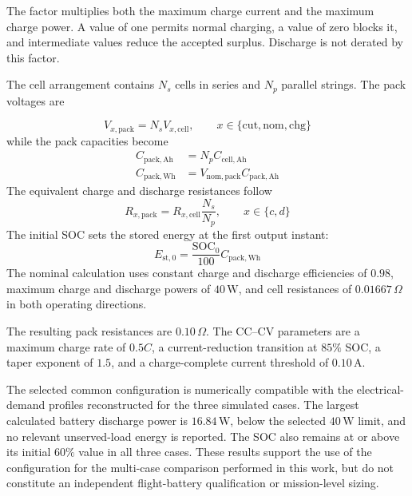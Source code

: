 The factor multiplies both the maximum charge current and the maximum charge
power. A value of one permits normal charging, a value of zero blocks it, and
intermediate values reduce the accepted surplus. Discharge is not derated by
this factor.

The cell arrangement contains $N_s$ cells in series and $N_p$ parallel
strings. The pack voltages are

\begin{equation}
    V_{x,\mathrm{pack}}
    =
    N_s V_{x,\mathrm{cell}},
    \qquad
    x\in\{\mathrm{cut},\mathrm{nom},\mathrm{chg}\}
    \label{eq:battery_pack_voltages_ch8}
\end{equation}
while the pack capacities become
\begin{align}
    C_{\mathrm{pack,Ah}}
    &=
    N_p C_{\mathrm{cell,Ah}}
    \label{eq:battery_pack_capacity_ah_ch8}
    \\
    C_{\mathrm{pack,Wh}}
    &=
    V_{\mathrm{nom,pack}}C_{\mathrm{pack,Ah}}
    \label{eq:battery_pack_capacity_wh_ch8}
\end{align}
The equivalent charge and discharge resistances follow
\begin{equation}
    R_{x,\mathrm{pack}}
    =
    R_{x,\mathrm{cell}}\frac{N_s}{N_p},
    \qquad
    x\in\{c,d\}
    \label{eq:battery_pack_resistance_ch8}
\end{equation}
The initial SOC sets the stored energy at the first output instant:
\begin{equation}
    E_{\mathrm{st},0}
    =
    \frac{\mathrm{SOC}_0}{100}C_{\mathrm{pack,Wh}}
    \label{eq:battery_initial_energy_ch8}
\end{equation}
The nominal calculation uses constant charge and discharge efficiencies of
\(0.98\), maximum charge and discharge powers of \(40\,\mathrm{W}\), and
cell resistances of \(0.01667\,\Omega\) in both operating directions. 

The resulting pack resistances are \(0.10\,\Omega\). The CC--CV parameters are a
maximum charge rate of \(0.5C\), a current-reduction transition at
\(85\%\) SOC, a taper exponent of \(1.5\), and a charge-complete current
threshold of \(0.10\,\mathrm{A}\).

The selected common configuration is numerically compatible with the
electrical-demand profiles reconstructed for the three simulated cases. The
largest calculated battery discharge power is \(16.84\,\mathrm{W}\), below
the selected \(40\,\mathrm{W}\) limit, and no relevant unserved-load energy is
reported. The SOC also remains at or above its initial \(60\%\) value in all
three cases. These results support the use of the configuration for the
multi-case comparison performed in this work, but do not constitute an
independent flight-battery qualification or mission-level sizing.

